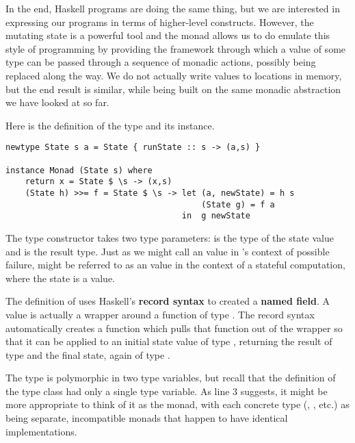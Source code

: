 In the end, Haskell programs are doing the same thing, but we are interested in expressing our programs in terms of higher-level 
constructs. However, the mutating state is a powerful tool and the  monad allows us to do emulate this style of
programming by providing the framework through which a value of some type can be passed through a sequence of monadic actions,
possibly being replaced along the way. We do not actually write values to locations in memory, but the end result is similar, while
being built on the same monadic abstraction we have looked at so far.

Here is the definition of the  type and its  instance.

\begin{lstlisting}
newtype State s a = State { runState :: s -> (a,s) }  

instance Monad (State s) where  
    return x = State $ \s -> (x,s)  
    (State h) >>= f = State $ \s -> let (a, newState) = h s  
                                        (State g) = f a  
                                    in  g newState 
\end{lstlisting}

The  type constructor takes two type parameters:  is the type of the state value and  is
the result type. Just as we might call  an  value in 's context of possible
failure,  might be referred to as an  value in the context of a stateful
computation, where the state is a  value.

The  definition of  uses Haskell's \textbf{record syntax} to created a \textbf{named field}.
A  value is actually a wrapper around a function of type . The record syntax automatically
creates a function  which pulls that function out of the wrapper so that it can be applied to an initial
state value of type , returning the result of type  and the final state, again of type .

The  type is polymorphic in two type variables, but recall that the definition of the  type class
had only a single type variable. As line 3 suggests, it might be more appropriate to think of it as the  monad,
with each concrete type (, , etc.) as being separate, incompatible monads that
happen to have identical implementations.

